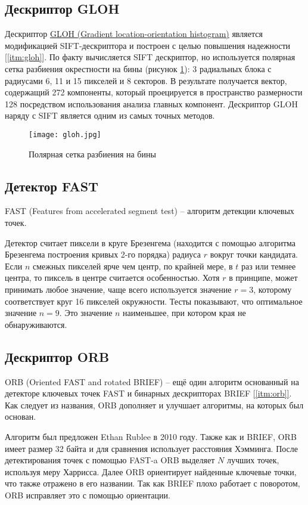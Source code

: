 \subsection{Дескриптор GLOH}

Дескриптор \hyperref[itm:gloh]{ GLOH (Gradient location-orientation histogram)} является модификацией SIFT-дескриптора и построен с целью повышения надежности \hyperref[itm:gloh]{[\ref{itm:gloh}]}. По факту вычисляется SIFT дескриптор, но используется полярная сетка разбиения окрестности на бины (рисунок \ref{fig:gloh}): 3 радиальных блока с радиусами 6, 11 и 15 пикселей и 8 секторов. В результате получается вектор, содержащий 272 компоненты, который проецируется в пространство размерности 128 посредством использования анализа главных компонент. Дескриптор GLOH наряду с SIFT является одним из самых точных методов.

\begin{figure}[h]
    \centering
    \texttt{[image: gloh.jpg]}
    \caption{Полярная сетка разбиения на бины}
    \label{fig:gloh}
\end{figure}

\subsection{Детектор FAST}

FAST (Features from accelerated segment test) -- алгоритм детекции ключевых точек.

Детектор считает пиксели в круге Брезенгема (находится с помощью алгоритма Брезенгема построения кривых 2-го порядка) радиуса $r$ вокруг точки кандидата. Если $n$ смежных пикселей ярче чем центр, по крайней мере, в $t$ раз или темнее центра, то пиксель в центре считается особенностью. Хотя $r$ в принципе, может принимать любое значение, чаще всего используется значение $r=3$, которому соответствует круг 16 пикселей окружности. Тесты показывают, что оптимальное значение $n=9$. Это значение $n$ наименьшее, при котором края не обнаруживаются.

\subsection{Дескриптор ORB}

ORB (Oriented FAST and rotated BRIEF) -- ещё один алгоритм основанный на детекторе ключевых точек FAST и бинарных дескрипторах BRIEF \hyperref[itm:orb]{[\ref{itm:orb}]}. Как следует из названия, ORB дополняет и улучшает алгоритмы, на которых был основан.

Алгоритм был предложен Ethan Rublee в 2010 году. Также как и BRIEF, ORB имеет размер 32 байта и для сравнения использует расстояния Хэмминга. После детектирования точек с помощью FAST-a ORB выделяет $N$ лучших точек, используя меру Харрисса. Далее ORB ориентирует найденные ключевые точки, что также отражено в его названии. Так как BRIEF плохо работает с поворотом, ORB исправляет это с помощью ориентации.

